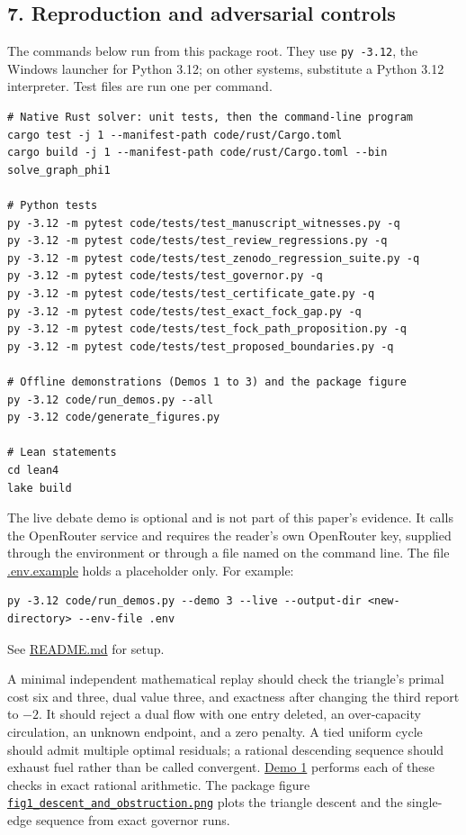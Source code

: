 \documentclass[
  11pt,
]{article}
\newcommand{\passthrough}[1]{#1}
\begin{document}
\subsection{7. Reproduction and adversarial
controls}\label{reproduction-and-adversarial-controls}

The commands below run from this package root. They use
\passthrough{\lstinline!py -3.12!}, the Windows launcher for Python
3.12; on other systems, substitute a Python 3.12 interpreter. Test files
are run one per command.

\begin{lstlisting}
# Native Rust solver: unit tests, then the command-line program
cargo test -j 1 --manifest-path code/rust/Cargo.toml
cargo build -j 1 --manifest-path code/rust/Cargo.toml --bin solve_graph_phi1

# Python tests
py -3.12 -m pytest code/tests/test_manuscript_witnesses.py -q
py -3.12 -m pytest code/tests/test_review_regressions.py -q
py -3.12 -m pytest code/tests/test_zenodo_regression_suite.py -q
py -3.12 -m pytest code/tests/test_governor.py -q
py -3.12 -m pytest code/tests/test_certificate_gate.py -q
py -3.12 -m pytest code/tests/test_exact_fock_gap.py -q
py -3.12 -m pytest code/tests/test_fock_path_proposition.py -q
py -3.12 -m pytest code/tests/test_proposed_boundaries.py -q

# Offline demonstrations (Demos 1 to 3) and the package figure
py -3.12 code/run_demos.py --all
py -3.12 code/generate_figures.py

# Lean statements
cd lean4
lake build
\end{lstlisting}

The live debate demo is optional and is not part of this paper's
evidence. It calls the OpenRouter service and requires the reader's own
OpenRouter key, supplied through the environment or through a file named
on the command line. The file
\href{../../001_pfp_discrete_cochain_retraction_and_toy_involutions/.env.example}{.env.example}
holds a placeholder only. For example:

\begin{lstlisting}
py -3.12 code/run_demos.py --demo 3 --live --output-dir <new-directory> --env-file .env
\end{lstlisting}

See \url{README.md} for setup.

A minimal independent mathematical replay should check the triangle's
primal cost six and three, dual value three, and exactness after
changing the third report to \(-2\). It should reject a dual flow with
one entry deleted, an over-capacity circulation, an unknown endpoint,
and a zero penalty. A tied uniform cycle should admit multiple optimal
residuals; a rational descending sequence should exhaust fuel rather
than be called convergent.
\href{../../001_pfp_discrete_cochain_retraction_and_toy_involutions/code/demo1_holonomy.py}{Demo
1} performs each of these checks in exact rational arithmetic. The
package figure
\href{../../001_pfp_discrete_cochain_retraction_and_toy_involutions/public_export/fig1_descent_and_obstruction.png}{\nolinkurl{fig1_descent_and_obstruction.png}}
plots the triangle descent and the single-edge sequence from exact
governor runs.
\end{document}
